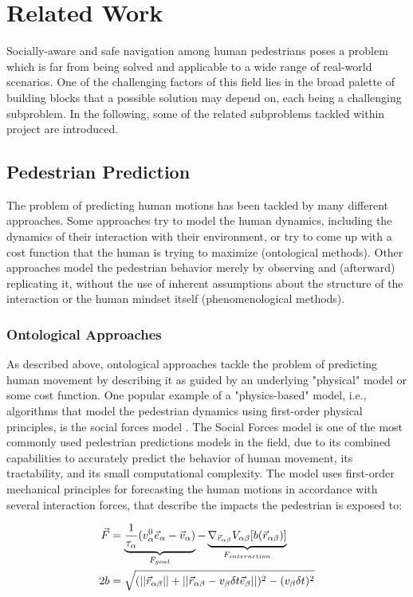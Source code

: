 \chapter{Related Work}
\label{text:related}
Socially-aware and safe navigation among human pedestrians poses a problem which is far from being solved and applicable to a wide range of real-world scenarios. One of the challenging factors of this field lies in the broad palette of building blocks that a possible solution may depend on, each being a challenging subproblem. In the following, some of the related subproblems tackled within project \project are introduced.

\section{Pedestrian Prediction}
\label{text:related/prediction}
The problem of predicting human motions has been tackled by many different approaches. Some approaches try to model the human dynamics, including the dynamics of their interaction with their environment, or try to come up with a cost function that the human is trying to maximize (ontological methods). Other approaches model the pedestrian behavior merely by observing and (afterward) replicating it, without the use of inherent assumptions about the structure of the interaction or the human mindset itself (phenomenological methods).

\subsection{Ontological Approaches}
As described above, ontological approaches tackle the problem of predicting human movement by describing it as guided by an underlying "physical" model or some cost function. One popular example of a "physics-based" model, i.e., algorithms that model the pedestrian dynamics using first-order physical principles, is the social forces model \cite{Helbing1995}. The Social Forces model is one of the most commonly used pedestrian predictions models in the field, due to its combined capabilities to accurately predict the behavior of human movement, its tractability, and its small computational complexity. The model uses first-order mechanical principles for forecasting the human motions in accordance with several interaction forces, that describe the impacts the pedestrian is exposed to:

\begin{align}
\vec{F} &= \underbrace{\frac{1}{\tau_{\alpha}} (v^0_{\alpha} \vec{e}_{\alpha} - \vec{v}_{\alpha})}_{F_{goal}} - \underbrace{\nabla_{\vec{r}_{\alpha \beta}} V_{\alpha \beta}[b(\vec{r}_{\alpha \beta})]}_{F_{interaction}} 
\label{eq:social_forces} \\
2b &= \sqrt{(||\vec{r}_{\alpha \beta}|| + ||\vec{r}_{\alpha \beta} - v_{\beta} \delta t \vec{e}_{\beta}||)^2 - (v_{\beta} \delta t)^2}
\end{align}

